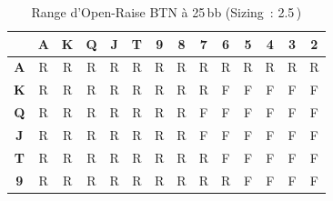 \documentclass[a4paper,11pt]{article}
\newcommand{\bb}{\,\mathrm{bb}}
\begin{document}
\begin{table}[H]
\centering
\caption{Range d'Open-Raise BTN \`a 25\,bb (Sizing~: 2.5\bb)}
\label{tab:open_btn}
\small
\begin{tabular}{c|*{13}{c}}
\toprule
 & \textbf{A} & \textbf{K} & \textbf{Q} & \textbf{J} & \textbf{T} & \textbf{9} & \textbf{8} & \textbf{7} & \textbf{6} & \textbf{5} & \textbf{4} & \textbf{3} & \textbf{2} \\
\midrule
\textbf{A} & \cellcolor{raise!30}R & \cellcolor{raise!30}R & \cellcolor{raise!30}R & \cellcolor{raise!30}R & \cellcolor{raise!30}R & \cellcolor{raise!30}R & \cellcolor{raise!30}R & \cellcolor{raise!25}R & \cellcolor{raise!20}R & \cellcolor{raise!20}R & \cellcolor{raise!15}R & \cellcolor{raise!15}R & \cellcolor{raise!15}R \\
\textbf{K} & \cellcolor{raise!30}R & \cellcolor{raise!30}R & \cellcolor{raise!30}R & \cellcolor{raise!30}R & \cellcolor{raise!30}R & \cellcolor{raise!25}R & \cellcolor{raise!20}R & \cellcolor{raise!15}R & \cellcolor{fold!20}F & \cellcolor{fold!20}F & \cellcolor{fold!20}F & \cellcolor{fold!20}F & \cellcolor{fold!20}F \\
\textbf{Q} & \cellcolor{raise!30}R & \cellcolor{raise!30}R & \cellcolor{raise!30}R & \cellcolor{raise!30}R & \cellcolor{raise!30}R & \cellcolor{raise!20}R & \cellcolor{raise!15}R & \cellcolor{fold!20}F & \cellcolor{fold!20}F & \cellcolor{fold!20}F & \cellcolor{fold!20}F & \cellcolor{fold!20}F & \cellcolor{fold!20}F \\
\textbf{J} & \cellcolor{raise!30}R & \cellcolor{raise!25}R & \cellcolor{raise!25}R & \cellcolor{raise!30}R & \cellcolor{raise!30}R & \cellcolor{raise!20}R & \cellcolor{raise!15}R & \cellcolor{fold!20}F & \cellcolor{fold!20}F & \cellcolor{fold!20}F & \cellcolor{fold!20}F & \cellcolor{fold!20}F & \cellcolor{fold!20}F \\
\textbf{T} & \cellcolor{raise!25}R & \cellcolor{raise!25}R & \cellcolor{raise!20}R & \cellcolor{raise!25}R & \cellcolor{raise!30}R & \cellcolor{raise!20}R & \cellcolor{raise!15}R & \cellcolor{raise!10}R & \cellcolor{fold!20}F & \cellcolor{fold!20}F & \cellcolor{fold!20}F & \cellcolor{fold!20}F & \cellcolor{fold!20}F \\
\textbf{9} & \cellcolor{raise!20}R & \cellcolor{raise!15}R & \cellcolor{raise!15}R & \cellcolor{raise!15}R & \cellcolor{raise!15}R & \cellcolor{raise!25}R & \cellcolor{raise!20}R & \cellcolor{raise!15}R & \cellcolor{raise!10}R & \cellcolor{fold!20}F & \cellcolor{fold!20}F & \cellcolor{fold!20}F & \cellcolor{fold!20}F \\

\end{tabular}
\end{table}
\end{document}
